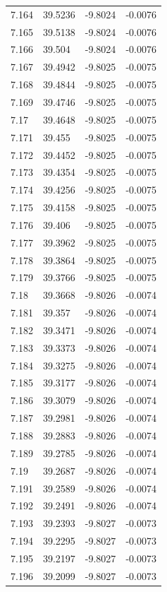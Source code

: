 \begin{tabular}{llll}
7.164 & 39.5236 & -9.8024 & -0.0076 \\
7.165 & 39.5138 & -9.8024 & -0.0076 \\
7.166 & 39.504 & -9.8024 & -0.0076 \\
7.167 & 39.4942 & -9.8025 & -0.0075 \\
7.168 & 39.4844 & -9.8025 & -0.0075 \\
7.169 & 39.4746 & -9.8025 & -0.0075 \\
7.17 & 39.4648 & -9.8025 & -0.0075 \\
7.171 & 39.455 & -9.8025 & -0.0075 \\
7.172 & 39.4452 & -9.8025 & -0.0075 \\
7.173 & 39.4354 & -9.8025 & -0.0075 \\
7.174 & 39.4256 & -9.8025 & -0.0075 \\
7.175 & 39.4158 & -9.8025 & -0.0075 \\
7.176 & 39.406 & -9.8025 & -0.0075 \\
7.177 & 39.3962 & -9.8025 & -0.0075 \\
7.178 & 39.3864 & -9.8025 & -0.0075 \\
7.179 & 39.3766 & -9.8025 & -0.0075 \\
7.18 & 39.3668 & -9.8026 & -0.0074 \\
7.181 & 39.357 & -9.8026 & -0.0074 \\
7.182 & 39.3471 & -9.8026 & -0.0074 \\
7.183 & 39.3373 & -9.8026 & -0.0074 \\
7.184 & 39.3275 & -9.8026 & -0.0074 \\
7.185 & 39.3177 & -9.8026 & -0.0074 \\
7.186 & 39.3079 & -9.8026 & -0.0074 \\
7.187 & 39.2981 & -9.8026 & -0.0074 \\
7.188 & 39.2883 & -9.8026 & -0.0074 \\
7.189 & 39.2785 & -9.8026 & -0.0074 \\
7.19 & 39.2687 & -9.8026 & -0.0074 \\
7.191 & 39.2589 & -9.8026 & -0.0074 \\
7.192 & 39.2491 & -9.8026 & -0.0074 \\
7.193 & 39.2393 & -9.8027 & -0.0073 \\
7.194 & 39.2295 & -9.8027 & -0.0073 \\
7.195 & 39.2197 & -9.8027 & -0.0073 \\
7.196 & 39.2099 & -9.8027 & -0.0073 \\

\end{tabular}
